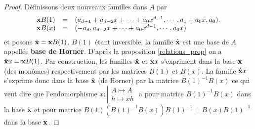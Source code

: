 \documentclass{standalone}
\begin{document}
\begin{proof}
Définissons deux nouveaux familles dans $A$ par
\begin{equation}
	\begin{array}{lll}
		\bold{x}B(1) & = & (a_{d-1} + a_{d-2}x + \cdots + a_0x^{d-1}, \cdots, a_1 + a_0x,  a_0).\\
		\bold{x}B(x) & = & (-a_d, a_{d-2}x + \cdots + a_0x^{d-1}, \cdots, a_0x)
	\end{array}
\end{equation}
et posons $\hat{\bold{x}} = \bold{x}B(1)$.
$B(1)$ étant inversible, la famille $\hat{\bold{x}}$ est une base de $A$ appellée {\bf base de Horner}.
D'après la proposition \ref{relations_prop} on a $\hat{\bold{x}}x = \bold{x}B(1)$. Par construction, les familles $\hat{\bold{x}}$ et $\hat{\bold{x}}x$ s'expriment dans la base $\bold{x}$ (des monômes) respectivement par les matrices $B(1)$ et $B(x)$.
La famille $\hat{\bold{x}}x$ s'exprime donc dans la base $\hat{\bold{x}}$ (de Horner) par la matrice $B(1)^{-1}B(x)$ ce qui veut dire que l'endomorphisme
$x : \left\vert
\begin{array}{c}
A \mapsto A \\
h \mapsto xh
\end{array}
\right.$ a pour matrice $B(1)^{-1}B(x)$ dans la base $\hat{\bold{x}}$
et pour matrice $B(1)(B(1)^{-1}B(x))B(1)^{-1} = B(x)B(1)^{-1}$ dans la base $\bold{x}$.
\end{proof}
\end{document}
